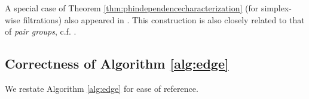 \documentclass[utf8]{frontiers_suppmat} %
\begin{document}





\begin{remark}
A special case of Theorem \ref{thm:phindependencecharacterization} (for simplex-wise filtrations) also appeared in \cite[Theorem 1]{wu}.  This construction is also closely related to that of \emph{pair groups}, c.f.  \cite{persistenthomologyasurvey}.
\end{remark}    

\subsection{Correctness of Algorithm \ref{alg:edge}}


We restate Algorithm \ref{alg:edge} for ease of reference.
\end{document}
